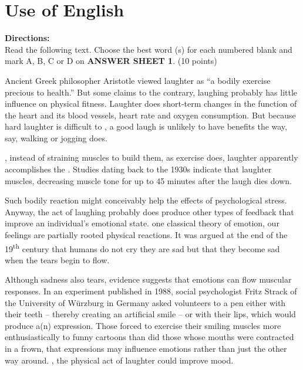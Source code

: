 


\section{Use of English}

\noindent
\textbf{Directions:}\\
Read the following text. Choose the best word (s) for each
	numbered blank and mark A, B, C or D on \textbf{ANSWER SHEET 1}. (10 points)



\TiGanSpace

Ancient Greek philosopher Aristotle viewed laughter as ``a bodily
exercise precious to health.'' But \cloze some claims to the
contrary, laughing probably has little influence on physical fitness.
Laughter does \cloze short-term changes in the function of the
heart and its blood vessels, \cloze heart rate and oxygen
consumption. But because hard laughter is difficult to \cloze , a
good laugh is unlikely to have \cloze benefits the way, say,
walking or jogging does.

\cloze , instead of straining muscles to build them, as exercise
does, laughter apparently accomplishes the \cloze. Studies dating
back to the 1930s indicate that laughter \cloze muscles,
decreasing muscle tone for up to 45 minutes after the laugh dies down.

Such bodily reaction might conceivably help \cloze the effects of
psychological stress. Anyway, the act of laughing probably does produce
other types of \cloze feedback that improve an individual's
emotional state. \cloze one classical theory of emotion, our
feelings are partially rooted \cloze physical reactions. It was
argued at the end of the 19\textsuperscript{th} century that humans do
not cry \cloze they are sad but that they become sad when the
tears begin to flow.

Although sadness also \cloze tears, evidence suggests that
emotions can flow \cloze muscular responses. In an experiment
published in 1988, social psychologist Fritz Strack of the University of
Würzburg in Germany asked volunteers to \cloze a pen either with
their teeth -- thereby creating an artificial smile -- or with their
lips, which would produce a(n) \cloze expression. Those forced
to exercise their smiling muscles \cloze more enthusiastically
to funny cartoons than did those whose mouths were contracted in a
frown, \cloze that expressions may influence emotions rather
than just the other way around. \cloze , the physical act of
laughter could improve mood.



